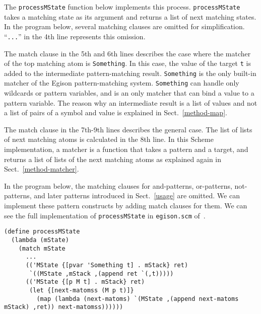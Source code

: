 \documentclass[acmlarge]{acmart}
\begin{document}
\medskip

The \texttt{processMState} function below implements this process.
\texttt{processMState} takes a matching state as its argument and returns a list of next matching states.
In the program below, several matching clauses are omitted for simplification.
``\texttt{...}'' in the 4th line represents this omission.

The match clause in the 5th and 6th lines describes the case where the matcher of the top matching atom is \texttt{Something}.
In this case, the value of the target \texttt{t} is added to the intermediate pattern-matching result.
\texttt{Something} is the only built-in matcher of the Egison pattern-matching system.
\texttt{Something} can handle only wildcards or pattern variables, and is an only matcher that can bind a value to a pattern variable.
The reason why an intermediate result is a list of values and not a list of pairs of a symbol and value is explained in Sect.~\ref{method-map}.

The match clause in the 7th-9th lines describes the general case.
The list of lists of next matching atoms is calculated in the 8th line.
In this Scheme implementation, a matcher is a function that takes a pattern and a target, and returns a list of lists of the next matching atoms as explained again in Sect.~\ref{method-matcher}.

In the program below, the matching clauses for and-patterns, or-patterns, not-patterns, and later patterns introduced in Sect.~\ref{usage} are omitted.
We can implement these pattern constructs by adding match clauses for them.
We can see the full implementation of \texttt{processMState} in \texttt{egison.scm} of~\cite{egisonScheme}.

\begin{lstlisting}[language=egison]
(define processMState
  (lambda (mState)
    (match mState
      ...
      (('MState {[pvar 'Something t] . mStack} ret)
       `((MState ,mStack ,(append ret `(,t)))))
      (('MState {[p M t] . mStack} ret)
       (let {[next-matomss (M p t)]}
         (map (lambda (next-matoms) `(MState ,(append next-matoms mStack) ,ret)) next-matomss))))))
\end{lstlisting}

\medskip
\end{document}
